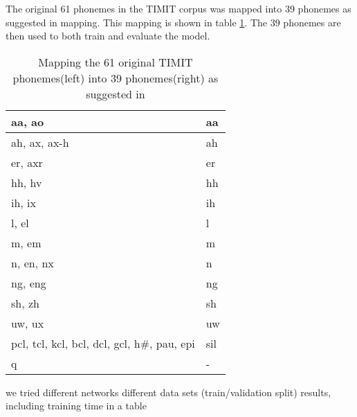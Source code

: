 The original 61 phonemes in the TIMIT corpus was mapped into 39 phonemes as suggested in {mapping}. This mapping is shown in table \ref{table:mapping}. The 39 phonemes are then used to both train and evaluate the model. 
\begin{center}
\begin{table}[H]
    \begin{tabular}{ | l | l |}
    \hline
    aa, ao & aa \\ \hline
    ah, ax, ax-h  & ah \\ \hline
    er, axr & er \\ \hline
    hh, hv & hh \\ \hline   
    ih, ix & ih \\ \hline
	l, el & l \\ \hline
	m, em & m \\ \hline
	n, en, nx & n \\ \hline
	ng, eng & ng \\ \hline
	sh, zh & sh \\ \hline
	uw, ux & uw \\ \hline
	pcl, tcl, kcl, bcl, dcl, gcl, h\#, pau, epi & sil \\ \hline
	q & - \\ \hline
    \hline
    \end{tabular}
    \caption{Mapping the 61 original TIMIT phonemes(left) into 39 phonemes(right) as suggested in \cite{mapping}}
    \label{table:mapping}
\end{table}
\end{center}


we tried different networks 
different data sets (train/validation split)
results, including training time
in a table